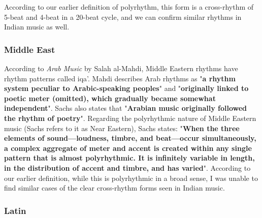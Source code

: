 According to our earlier definition of polyrhythm, this form is a cross-rhythm of 5-beat and 4-beat in a 20-beat cycle, and we can confirm similar rhythms in Indian music as well.


\subsubsection{Middle East}

According to \textit{Arab Music} by Salah al-Mahdi, Middle Eastern rhythms have rhythm patterns called iqa'. Mahdi describes Arab rhythms as "\textbf{a rhythm system peculiar to Arabic-speaking peoples}"\cite{mahdi:01} and "\textbf{originally linked to poetic meter (omitted), which gradually became somewhat independent}"\cite{mahdi:01}. Sachs also states that "\textbf{Arabian music originally followed the rhythm of poetry}"\cite{sachs:01}. Regarding the polyrhythmic nature of Middle Eastern music (Sachs refers to it as Near Eastern), Sachs states: "\textbf{When the three elements of sound—loudness, timbre, and beat—occur simultaneously, a complex aggregate of meter and accent is created within any single pattern that is almost polyrhythmic. It is infinitely variable in length, in the distribution of accent and timbre, and has varied}"\cite{sachs:01}. According to our earlier definition, while this is polyrhythmic in a broad sense, I was unable to find similar cases of the clear cross-rhythm forms seen in Indian music.



\subsubsection{Latin}

